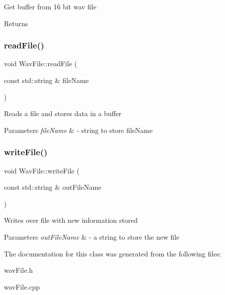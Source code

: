 Get buffer from 16 bit wav file \begin{DoxyReturn}{Returns}

\end{DoxyReturn}
\mbox{\label{classWavFile_ac8b9d7fa3bb2d06b6d089089fc48ee5a}} 
\subsubsection{\texorpdfstring{read\+File()}{readFile()}}
{\footnotesize\ttfamily void Wav\+File\+::read\+File (\begin{DoxyParamCaption}\item[{const std\+::string \&}]{file\+Name }\end{DoxyParamCaption})}

Reads a file and stores data in a buffer 
\begin{DoxyParams}{Parameters}
{\em file\+Name} & -\/ string to store file\+Name \\
\hline
\end{DoxyParams}
\mbox{\label{classWavFile_ab057c127fb35388e9a49e5b37b9088ad}} 
\subsubsection{\texorpdfstring{write\+File()}{writeFile()}}
{\footnotesize\ttfamily void Wav\+File\+::write\+File (\begin{DoxyParamCaption}\item[{const std\+::string \&}]{out\+File\+Name }\end{DoxyParamCaption})}

Writes over file with new information stored 
\begin{DoxyParams}{Parameters}
{\em out\+File\+Name} & -\/ a string to store the new file \\
\hline
\end{DoxyParams}


The documentation for this class was generated from the following files\+:\begin{DoxyCompactItemize}
\item 
wav\+File.\+h\item 
wav\+File.\+cpp\end{DoxyCompactItemize}
